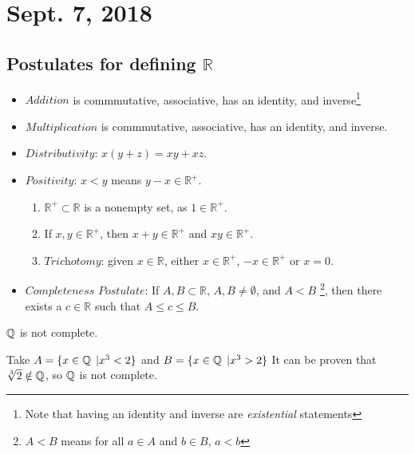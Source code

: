 \section{Sept. 7, 2018}
\subsection{Postulates for defining \texorpdfstring{$\mathbb{R}$}{R}}
\begin{itemize}
    \item $\textit{Addition}$ is commmutative, associative, has an identity, and inverse\footnote{Note that having an identity and inverse are \emph{existential} statements}

    \item $\textit{Multiplication}$ is commmutative, associative, has an identity, and inverse.

    \item $\textit{Distributivity}$: $x(y+z) = xy + xz$.

    \item $\textit{Positivity}$: $x<y$ means $y-x \in \mathbb{R}^+$.
    \begin{enumerate}
        \item $\mathbb{R}^+ \subset \mathbb{R}$ is a nonempty set, as $1 \in \mathbb{R}^+$.
        \item If $x,y \in \mathbb{R}^+$, then $x+y \in \mathbb{R}^+$ and $xy \in \mathbb{R}^+$.
        \item $\textit{Trichotomy}$: given $x \in \mathbb{R}$, either $x \in \mathbb{R}^+$, $-x \in \mathbb{R}^+$ or $x=0$.
    \end{enumerate}

    \item $\textit{Completeness Postulate}$: If $A,B \subset \mathbb{R}$, $A,B \ne \emptyset$, and $A<B$ \footnote{$A<B$ means for all $a \in A$ and $b \in B$, $a<b$ }, then there exists a $c \in \mathbb{R}$ such that $A \le c \le B$.

\end{itemize}

\begin{example}
    $\operatorname{\mathbb{Q}}$ is not complete.
    
    \begin{soln}
        Take $A = \{ x \in \operatorname{\mathbb{Q}} \;| x^3 < 2 \}$ and $B = \{ x \in \operatorname{\mathbb{Q}} \;| x^3 > 2\}$
        It can be proven that $\sqrt[3]{2} \notin \operatorname{\mathbb{Q}}$, so $\operatorname{\mathbb{Q}}$ is not complete.
    \end{soln}

\end{example}


